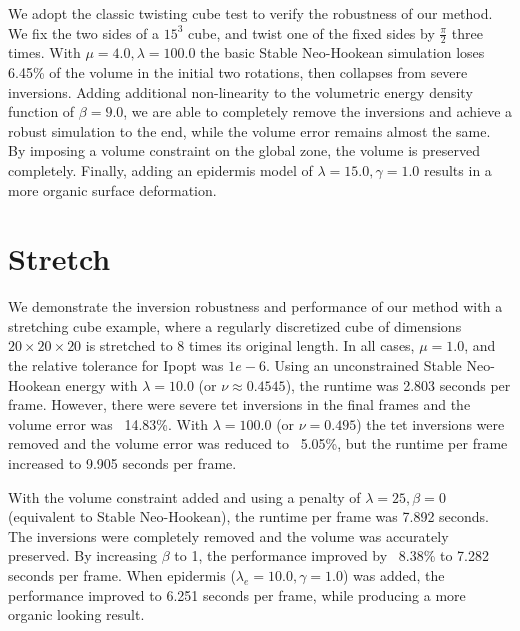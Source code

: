 We adopt the classic twisting cube test to verify the robustness of our method. We fix the two sides
of a $15^3$ cube, and twist one of the fixed sides by $\frac{\pi}{2}$ three times. With $\mu = 4.0,
\lambda = 100.0$ the basic Stable Neo-Hookean simulation loses 6.45\% of the volume in the
initial two rotations, then collapses from severe inversions. Adding additional non-linearity to the volumetric energy density function of $\beta = 9.0$, we are able to completely remove the inversions and achieve a robust simulation to the end, while the volume error remains almost the same. By imposing a volume constraint on the global zone, the volume is preserved completely. Finally, adding an epidermis model of $\lambda = 15.0, \gamma = 1.0$ results in a more organic surface deformation.

\section{Stretch}
We demonstrate the inversion robustness and performance of our method with a stretching cube example, where a regularly discretized cube of dimensions $20 \times 20 \times 20$ is stretched to 8 times its original length. In all cases, $\mu = 1.0$, and the relative tolerance for Ipopt was $1e-6$. Using an unconstrained Stable Neo-Hookean energy with $\lambda = 10.0$ (or $\nu \approx 0.4545$), the runtime was 2.803 seconds per frame. However, there were severe tet inversions in the final frames and the volume error was ~14.83\%. With $\lambda = 100.0$ (or $\nu = 0.495$) the tet inversions were removed and the volume error was reduced to ~5.05\%, but the runtime per frame increased to 9.905 seconds per frame.

With the volume constraint added and using a penalty of $\lambda = 25, \beta = 0$ (equivalent to Stable Neo-Hookean), the runtime per frame was 7.892 seconds. The inversions were completely removed and the volume was accurately preserved. By increasing $\beta$ to 1, the performance improved by ~8.38\% to 7.282 seconds per frame. When epidermis ($\lambda_e = 10.0, \gamma = 1.0$) was added, the performance improved to 6.251 seconds per frame, while producing a more organic looking result.

